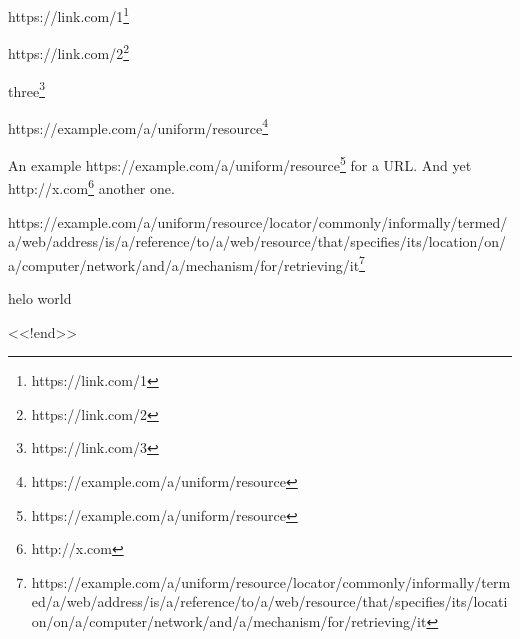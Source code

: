 


\vspace{\myLineheight}\begin{multicols}{2}\raggedcolumns{}

https://link.com/1\footnote{https://link.com/1}

{\mktsStyleUrl{}https:\g/\g/\g\allowbreak{}link.com/2\footnote{https://link.com/2}}

three\footnote{https://link.com/3}

{\mktsStyleUrl{}https:\g/\g/\g\allowbreak{}example.com\g/\g\allowbreak{}a\g/\g\allowbreak{}uniform\g/\g\allowbreak{}resource\footnote{https://example.com/a/uniform/resource}}

An example {\mktsStyleUrl{}https:\g/\g/\g\allowbreak{}example.com\g/\g\allowbreak{}a\g/\g\allowbreak{}uniform\g/\g\allowbreak{}resource\footnote{https://example.com/a/uniform/resource}} for a URL.
And yet http://x.com\footnote{http://x.com} another one.

{\mktsStyleUrl{}https:\g/\g/\g\allowbreak{}example.com\g/\g\allowbreak{}a\g/\g\allowbreak{}uniform\g/\g\allowbreak{}resource\g/\g\allowbreak{}locator\g/\g\allowbreak{}commonly\g/\g\allowbreak{}informally\g/\g\allowbreak{}termed\g/\g\allowbreak{}a\g/\g\allowbreak{}web\g/\g\allowbreak{}address\g/\g\allowbreak{}is\g/\g\allowbreak{}a\g/\g\allowbreak{}reference\g/\g\allowbreak{}to\g/\g\allowbreak{}a\g/\g\allowbreak{}web\g/\g\allowbreak{}resource\g/\g\allowbreak{}that\g/\g\allowbreak{}specifies\g/\g\allowbreak{}its\g/\g\allowbreak{}location\g/\g\allowbreak{}on\g/\g\allowbreak{}a\g/\g\allowbreak{}computer\g/\g\allowbreak{}network\g/\g\allowbreak{}and\g/\g\allowbreak{}a\g/\g\allowbreak{}mechanism\g/\g\allowbreak{}for\g/\g\allowbreak{}retrieving\g/\g\allowbreak{}it\footnote{https://example.com/a/uniform/resource/locator/commonly/informally/termed/a/web/address/is/a/reference/to/a/web/resource/that/specifies/its/location/on/a/computer/network/and/a/mechanism/for/retrieving/it}}
\end{multicols}



{\mktsStyleFontCjkKaishu{}helo world}

<<!end>>


